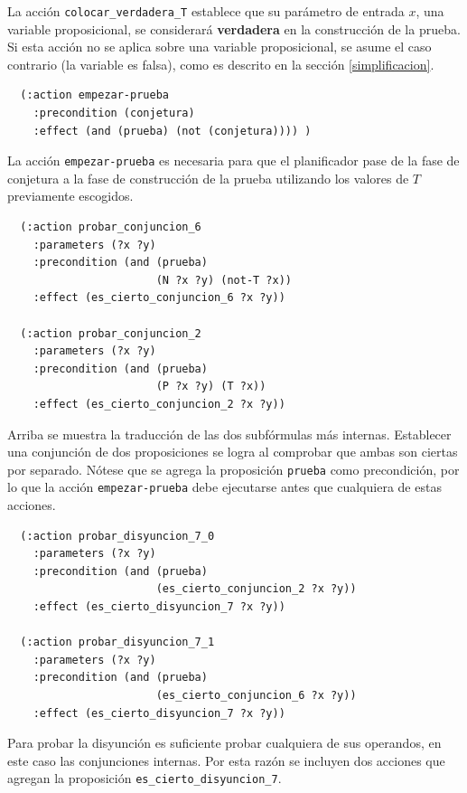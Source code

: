 La acción \texttt{colocar\_verdadera\_T} establece que su parámetro de entrada
$x$, una variable proposicional, se considerará \textbf{verdadera} en la
construcción de la prueba. Si esta acción no se aplica sobre una variable
proposicional, se asume el caso contrario (la variable es falsa), como es
descrito en la sección \ref{simplificacion}.

\begin{verbatim}
  (:action empezar-prueba
    :precondition (conjetura)
    :effect (and (prueba) (not (conjetura)))) )
 \end{verbatim}

La acción \texttt{empezar-prueba} es necesaria para que el planificador pase de la fase
de conjetura a la fase de construcción de la prueba utilizando los valores de
$T$ previamente escogidos.

\begin{verbatim}
  (:action probar_conjuncion_6
    :parameters (?x ?y)
    :precondition (and (prueba)
                       (N ?x ?y) (not-T ?x))
    :effect (es_cierto_conjuncion_6 ?x ?y))

  (:action probar_conjuncion_2
    :parameters (?x ?y)
    :precondition (and (prueba)
                       (P ?x ?y) (T ?x))
    :effect (es_cierto_conjuncion_2 ?x ?y))
\end{verbatim}

Arriba se muestra la traducción de las dos subfórmulas más internas. Establecer
una conjunción de dos proposiciones se logra al comprobar que ambas son ciertas
por separado. Nótese que se agrega la proposición \texttt{prueba} como
precondición, por lo que la acción \texttt{empezar-prueba} debe ejecutarse
antes que cualquiera de estas acciones.

\begin{verbatim}
  (:action probar_disyuncion_7_0
    :parameters (?x ?y)
    :precondition (and (prueba)
                       (es_cierto_conjuncion_2 ?x ?y))
    :effect (es_cierto_disyuncion_7 ?x ?y))

  (:action probar_disyuncion_7_1
    :parameters (?x ?y)
    :precondition (and (prueba)
                       (es_cierto_conjuncion_6 ?x ?y))
    :effect (es_cierto_disyuncion_7 ?x ?y))
\end{verbatim}

Para probar la disyunción es suficiente probar cualquiera de sus operandos, en
este caso las conjunciones internas. Por esta razón se incluyen dos acciones
que agregan la proposición \texttt{es\_cierto\_disyuncion\_7}.


